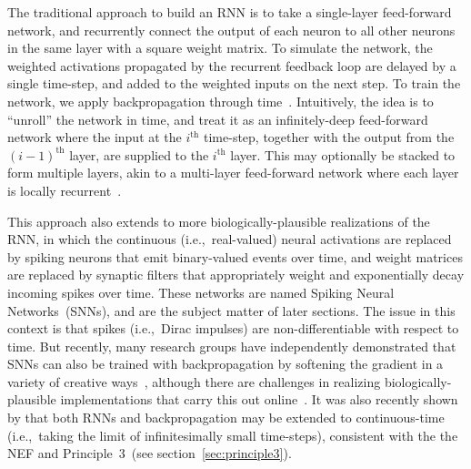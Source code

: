 The traditional approach to build an RNN is to take a single-layer feed-forward network, and recurrently connect the output of each neuron to all other neurons in the same layer with a square weight matrix.
To simulate the network, the weighted activations propagated by the recurrent feedback loop are delayed by a single time-step, and added to the weighted inputs on the next step.
To train the network, we apply backpropagation through time~\citep[BPTT;][]{werbos1990backpropagation}.
Intuitively, the idea is to ``unroll'' the network in time, and treat it as an infinitely-deep feed-forward network where the input at the $i^\text{th}$ time-step, together with the output from the $(i-1)^\text{th}$ layer, are supplied to the $i^\text{th}$ layer.
This may optionally be stacked to form multiple layers, akin to a multi-layer feed-forward network where each layer is locally recurrent~\citep{pascanu2013construct}.

This approach also extends to more biologically-plausible realizations of the RNN, in which the continuous (i.e.,~real-valued) neural activations are replaced by spiking neurons that emit binary-valued events over time, and weight matrices are replaced by synaptic filters that appropriately weight and exponentially decay incoming spikes over time.
These networks are named Spiking Neural Networks~(SNNs), and are the subject matter of later sections.
The issue in this context is that spikes (i.e.,~Dirac impulses) are non-differentiable with respect to time.
But recently, many research groups have independently demonstrated that SNNs can also be trained with backpropagation by softening the gradient in a variety of creative ways~\citep{hunsberger2015spiking, hunsberger2016training, marblestone2016toward, neftci2017neuromorphic, bellec2018long, hunsberger2018, huh2018gradient, severa2018whetstone, rasmussen2018nengodl, neftci2019surrogate}, although there are challenges in realizing biologically-plausible implementations that carry this out online~\citep[][submitted]{hunsberger2018, stockel2019align}.
It was also recently shown by \citet{chen2018neural} that both RNNs and backpropagation may be extended to continuous-time (i.e.,~taking the limit of infinitesimally small time-steps), consistent with the the NEF and Principle~3~(see section~\ref{sec:principle3}).
 
